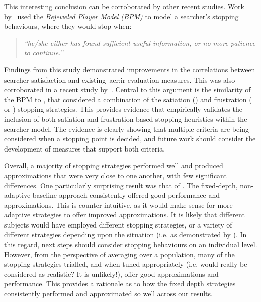 This interesting conclusion can be corroborated by other recent studies. Work by~\cite{zhang2017bejewled} used the \emph{Bejeweled Player Model (BPM)} to model a searcher's stopping behaviours, where they would stop when:

\begin{quote}
    \emph{``he/she either has found sufficient useful information, or no more patience to continue.''}
\end{quote}

Findings from this study demonstrated improvements in the correlations between searcher satisfaction and existing~\gls{acr:ir} evaluation measures. This was also corroborated in a recent study by~\cite{azzopardi2018cwl}. Central to this argument is the similarity of the BPM to , that considered a combination of the satiation () and frustration ( or ) stopping strategies. This provides evidence that empirically validates the inclusion of both satiation and frustration-based stopping heuristics within the searcher model. The evidence is clearly showing that multiple criteria are being considered when a stopping point is decided, and future work should consider the development of measures that support both criteria.

Overall, a majority of stopping strategies performed well and produced approximations that were very close to one another, with few significant differences. One particularly surprising result was that of . The fixed-depth, non-adaptive baseline approach consistently offered good performance and approximations. This is counter-intuitive, as it would make sense for more adaptive strategies to offer improved approximations. It is likely that different subjects would have employed different stopping strategies, or a variety of different strategies depending upon the situation (i.e. as demonstrated by ). In this regard, next steps should consider stopping behaviours on an individual level. However, from the perspective of averaging over a population, many of the stopping strategies trialled, and when tuned appropriately (i.e. would  really be considered as realistic? It is unlikely!), offer good approximations and performance. This provides a rationale as to how the fixed depth strategies consistently performed and approximated so well across our results.


